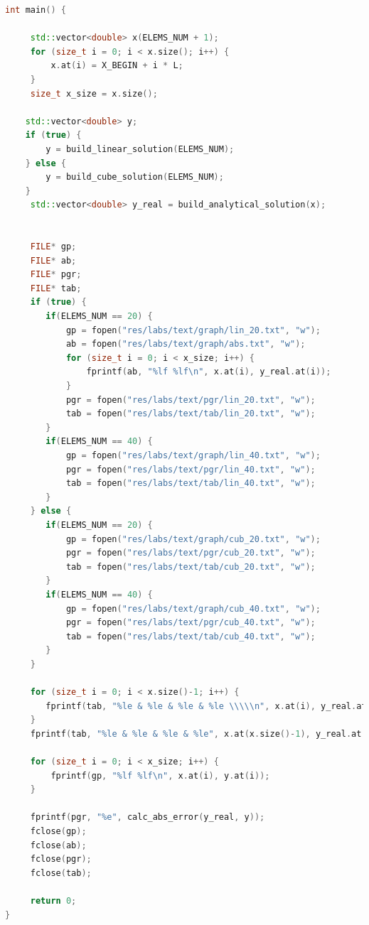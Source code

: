 \begin{lstlisting}[language=c++, label=prog,caption={\textit{Реализация МКЭ}}]
int main() {

     std::vector<double> x(ELEMS_NUM + 1);
     for (size_t i = 0; i < x.size(); i++) {
         x.at(i) = X_BEGIN + i * L;
     }
     size_t x_size = x.size();

    std::vector<double> y;
    if (true) {
        y = build_linear_solution(ELEMS_NUM);
    } else {
        y = build_cube_solution(ELEMS_NUM);
    }
     std::vector<double> y_real = build_analytical_solution(x);
    

     FILE* gp;
     FILE* ab;
     FILE* pgr;
     FILE* tab;
     if (true) {
        if(ELEMS_NUM == 20) {
            gp = fopen("res/labs/text/graph/lin_20.txt", "w");
            ab = fopen("res/labs/text/graph/abs.txt", "w");
            for (size_t i = 0; i < x_size; i++) {
                fprintf(ab, "%lf %lf\n", x.at(i), y_real.at(i));
            }
            pgr = fopen("res/labs/text/pgr/lin_20.txt", "w");
            tab = fopen("res/labs/text/tab/lin_20.txt", "w");
        }
        if(ELEMS_NUM == 40) {
            gp = fopen("res/labs/text/graph/lin_40.txt", "w");
            pgr = fopen("res/labs/text/pgr/lin_40.txt", "w");
            tab = fopen("res/labs/text/tab/lin_40.txt", "w");
        }
     } else {
        if(ELEMS_NUM == 20) {
            gp = fopen("res/labs/text/graph/cub_20.txt", "w");
            pgr = fopen("res/labs/text/pgr/cub_20.txt", "w");
            tab = fopen("res/labs/text/tab/cub_20.txt", "w");
        }
        if(ELEMS_NUM == 40) {
            gp = fopen("res/labs/text/graph/cub_40.txt", "w");
            pgr = fopen("res/labs/text/pgr/cub_40.txt", "w");
            tab = fopen("res/labs/text/tab/cub_40.txt", "w");
        }
     }

     for (size_t i = 0; i < x.size()-1; i++) {
        fprintf(tab, "%le & %le & %le & %le \\\\\n", x.at(i), y_real.at(i), y.at(i), std::fabs(y_real.at(i) - y.at(i)));
     }
     fprintf(tab, "%le & %le & %le & %le", x.at(x.size()-1), y_real.at(x.size()-1), y.at(x.size()-1), std::fabs(y_real.at(x.size()-1) - y.at(x.size()-1)));

     for (size_t i = 0; i < x_size; i++) {
         fprintf(gp, "%lf %lf\n", x.at(i), y.at(i));
     }

     fprintf(pgr, "%e", calc_abs_error(y_real, y));
     fclose(gp);
     fclose(ab);
     fclose(pgr);
     fclose(tab);

     return 0;
}

\end{lstlisting}
